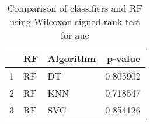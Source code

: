 \begin{table}
\footnotesize
\caption{Comparison of classifiers and RF using Wilcoxon signed-rank test for auc}
\label{tab:RF wilcoxon AUC comparison}
\begin{tabular}{lllr}
\hline
 & RF & Algorithm & p-value \\
\hline
1 & RF & DT & 0.805902 \\
2 & RF & KNN & 0.718547 \\
3 & RF & SVC & 0.854126 \\
\hline
\end{tabular}
\end{table}
